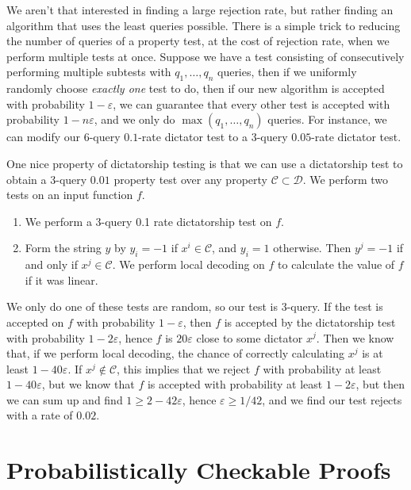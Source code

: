We aren't that interested in finding a large rejection rate, but rather finding an algorithm that uses the least queries possible. There is a simple trick to reducing the number of queries of a property test, at the cost of rejection rate, when we perform multiple tests at once. Suppose we have a test consisting of consecutively performing multiple subtests with $q_1, \dots, q_n$ queries, then if we uniformly randomly choose {\it exactly one} test to do, then if our new algorithm is accepted with probability $1 - \varepsilon$, we can guarantee that every other test is accepted with probability $1 - n \varepsilon$, and we only do $\max(q_1, \dots, q_n)$ queries. For instance, we can modify our 6-query $0.1$-rate dictator test to a 3-query $0.05$-rate dictator test.

One nice property of dictatorship testing is that we can use a dictatorship test to obtain a 3-query $0.01$ property test over any property $\mathcal{C} \subset \mathcal{D}$. We perform two tests on an input function $f$.
%
\begin{enumerate}
    \item We perform a 3-query 0.1 rate dictatorship test on $f$.
    \item Form the string $y$ by $y_i = -1$ if $x^i \in \mathcal{C}$, and $y_i = 1$ otherwise. Then $y^j = -1$ if and only if $x^j \in \mathcal{C}$. We perform local decoding on $f$ to calculate the value of $f$ if it was linear.
\end{enumerate}
%
We only do one of these tests are random, so our test is 3-query. If the test is accepted on $f$ with probability $1 - \varepsilon$, then $f$ is accepted by the dictatorship test with probability $1 - 2\varepsilon$, hence $f$ is $20 \varepsilon$ close to some dictator $x^j$. Then we know that, if we perform local decoding, the chance of correctly calculating $x^j$ is at least $1 - 40 \varepsilon$. If $x^j \not \in \mathcal{C}$, this implies that we reject $f$ with probability at least $1 - 40 \varepsilon$, but we know that $f$ is accepted with probability at least $1 - 2 \varepsilon$, but then we can sum up and find $1 \geq 2 - 42 \varepsilon$, hence $\varepsilon \geq 1/42$, and we find our test rejects with a rate of $0.02$.

\section{Probabilistically Checkable Proofs}

